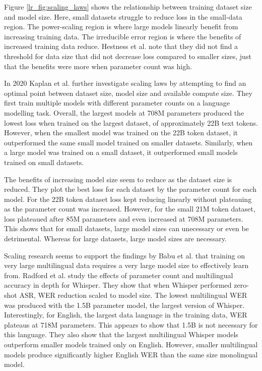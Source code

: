 Figure \ref{lr_fig:scaling_laws} shows the relationship between training dataset size and model size. Here, small datasets struggle to reduce loss in the small-data region. The power-scaling region is where large models linearly benefit from increasing training data. The irreducible error region is where the benefits of increased training data reduce. Hestness et al. \cite{hestness2017deep} note that they did not find a threshold for data size that did not decrease loss compared to smaller sizes, just that the benefits were more when parameter count was high.

In 2020 Kaplan et al. \cite{kaplan2020scaling} further investigate scaling laws by attempting to find an optimal point between dataset size, model size and available compute size. They first train multiple models with different parameter counts on a language modelling task. Overall, the largest models at 708M parameters produced the lowest loss when trained on the largest dataset, of approximately 22B text tokens. However, when the smallest model was trained on the 22B token dataset, it outperformed the same small model trained on smaller datasets. Similarly, when a large model was trained on a small dataset, it outperformed small models trained on small datasets. 

The benefits of increasing model size seem to reduce as the dataset size is reduced. They plot the best loss for each dataset by the parameter count for each model. For the 22B token dataset loss kept reducing linearly without plateauing as the parameter count was increased. However, for the small 21M token dataset, loss plateaued after 85M parameters and even increased at 708M parameters. This shows that for small datasets, large model sizes can unecessary or even be detrimental. Whereas for large datasets, large model sizes are necessary.

Scaling research seems to support the findings by Babu et al. \cite{babu2021xlsr} that training on very large multilingual data requires a very large model size to effectively learn from. Radford et al. \cite{whisper} study the effects of parameter count and multilingual accuracy in depth for Whisper. They show that when Whisper performed zero-shot ASR, WER reduction scaled to model size. The lowest multilingual WER was produced with the 1.5B parameter model, the largest version of Whisper. Interestingly, for English, the largest data language in the training data, WER plateaus at 718M parameters. This appears to show that 1.5B is not necessary for this language. They also show that the largest multilingual Whisper models outperform smaller models trained only on English. However, smaller multilingual models produce significantly higher English WER than the same size monolingual model. 

